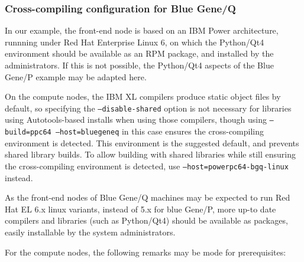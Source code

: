 \documentclass[a4paper,10pt,twoside]{csshortdoc}
\begin{document}
\subsubsection{Cross-compiling configuration for Blue Gene/Q}

In our example, the front-end node is based on an IBM Power architecture,
runnning under Red Hat Enterprise Linux 6, on which the Python/Qt4
environment should be available as an RPM package, and installed by the
administrators. If this is not possible, the Python/Qt4 aspects of the
Blue Gene/P example may be adapted here.

On the compute nodes, the IBM XL compilers produce static object files
by default, so specifying the \texttt{--disable-shared} option is not necessary
for libraries using Autotools-based installs when using those compilers,
though using \texttt{--build=ppc64 --host=bluegeneq} in this case ensures
the cross-compiling environment is detected. This environment
is the suggested default, and prevents shared library builds.
To allow building with shared libraries while still ensuring the
cross-compiling environment is detected,
use \texttt{--host=powerpc64-bgq-linux} instead.

As the front-end nodes of Blue Gene/Q machines may be expected to run
Red Hat EL 6.x linux variants, instead of 5.x for blue Gene/P, more
up-to date compilers and libraries (such as Python/Qt4) should be available
as packages, easily installable by the system administrators.

For the compute nodes, the following remarks may be mode for prerequisites:
\end{document}
